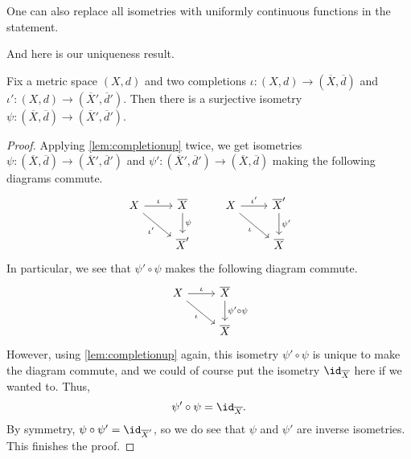 \documentclass[../notes.tex]{subfiles}
\begin{document}
\begin{remark}
	One can also replace all isometries with uniformly continuous functions in the statement.
\end{remark}
And here is our uniqueness result.
\begin{theorem}
	Fix a metric space $(X,d)$ and two completions $\iota\colon(X,d)\to(\overline X,\overline d)$ and $\iota'\colon(X,d)\to(\overline X',\overline d')$. Then there is a surjective isometry $\psi\colon(\overline X,\overline d)\to(\overline X',\overline d')$.
\end{theorem}
\begin{proof}
	Applying \autoref{lem:completionup} twice, we get isometries $\psi\colon(\overline X,\overline d)\to(\overline X',\overline d')$ and $\psi'\colon(\overline X',\overline d')\to(\overline X,\overline d)$ making the following diagrams commute.
	\[\begin{tikzcd}
		X & {\overline X} & X & {\overline X'} \\
		& {\overline X'} && {\overline X}
		\arrow["\iota", from=1-1, to=1-2]
		\arrow["{\iota'}"', from=1-1, to=2-2]
		\arrow["\psi", from=1-2, to=2-2]
		\arrow["{\iota'}", from=1-3, to=1-4]
		\arrow["{\psi'}", from=1-4, to=2-4]
		\arrow["\iota"', from=1-3, to=2-4]
	\end{tikzcd}\]
	In particular, we see that $\psi'\circ\psi$ makes the following diagram commute.
	\[\begin{tikzcd}
		X & {\overline X} \\
		& {\overline X}
		\arrow["\iota", from=1-1, to=1-2]
		\arrow["\iota"', from=1-1, to=2-2]
		\arrow["{\psi'\circ\psi}", from=1-2, to=2-2]
	\end{tikzcd}\]
	However, using \autoref{lem:completionup} again, this isometry $\psi'\circ\psi$ is unique to make the diagram commute, and we could of course put the isometry $\id_{\overline X}$ here if we wanted to. Thus,
	\[\psi'\circ\psi={\id_{\overline X}}.\]
	By symmetry, $\psi\circ\psi'=\id_{\overline X'}$, so we do see that $\psi$ and $\psi'$ are inverse isometries. This finishes the proof.
\end{proof}
\end{document}

